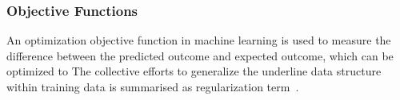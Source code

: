 \subsubsection{Objective Functions}
An optimization objective function in machine learning is used to measure the difference between the predicted outcome and expected outcome, which can be optimized to  The collective efforts to generalize the underline data structure within training data is summarised as regularization term~\cite{goodfellow_2015}.  